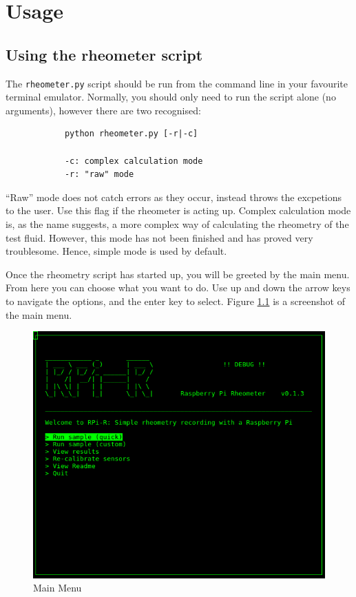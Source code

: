 \documentclass{report}
\begin{document}
	\chapter{Usage}
	
		\section{Using the rheometer script}
		
		The \texttt{rheometer.py} script should be run from the command line in your favourite terminal emulator. Normally, you should only need to run the script alone (no arguments), however there are two recognised:
		\begin{verbatim}
			python rheometer.py [-r|-c]
			
			-c: complex calculation mode
			-r: "raw" mode
		\end{verbatim}
		``Raw'' mode does not catch errors as they occur, instead throws the excpetions to the user. Use this flag if the rheometer is acting up. Complex calculation mode is, as the name suggests, a more complex way of calculating the rheometry of the test fluid. However, this mode has not been finished and has proved very troublesome. Hence, simple mode is used by default.
		
		Once the rheometry script has started up, you will be greeted by the main menu. From here you can choose what you want to do. Use up and down the arrow keys to navigate the options, and the enter key to select. Figure \ref{figmenumain} is a screenshot of the main menu. 
		
		\begin{figure}
			\centering
			\includegraphics[width=.8\textwidth]{./../graphics/figmenumain.png}
			\caption{Main Menu}
			\label{figmenumain}
		\end{figure}
		
\end{document}
